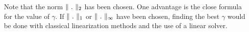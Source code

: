 Note that the norm $\norm{\ .\ }_2$ has been chosen. One advantage is the close formula for the value of $\gamma$. If $\norm{\ .\ }_1$ or $\norm{\ .\ }_{\infty}$ have been chosen, finding the best $\gamma$ would be done with classical linearization methods and the use of a linear solver.






